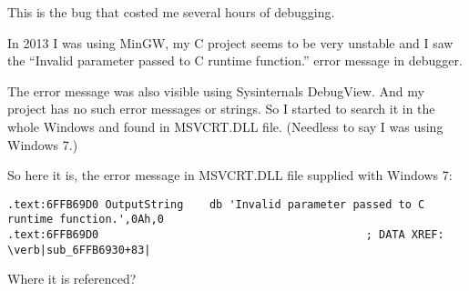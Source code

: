 
This is the bug that costed me several hours of debugging.

In 2013 I was using MinGW, my C project seems to be very unstable and I saw the
``Invalid parameter passed to C runtime function.'' error message in debugger.

The error message was also visible using Sysinternals DebugView.
And my project has no such error messages or strings.
So I started to search it in the whole Windows and found in MSVCRT.DLL file.
(Needless to say I was using Windows 7.)

So here it is, the error message in MSVCRT.DLL file supplied with Windows 7:

\begin{lstlisting}[style=customasmx86]
.text:6FFB69D0 OutputString    db 'Invalid parameter passed to C runtime function.',0Ah,0
.text:6FFB69D0                                         ; DATA XREF: \verb|sub_6FFB6930+83|
\end{lstlisting}

Where it is referenced?

